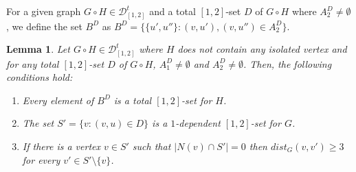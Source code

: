 \documentclass[A4,12pt]{article}
\newtheorem{lemma}[theorem]{Lemma}
\theoremstyle{definition}
\theoremstyle{remark}
\begin{document}
 For a given graph $G \circ H \in \mathcal{D}^t_{[1,2]}$ and a total $[1,2]$-set $D$ of  $G \circ H$ where $A_2^D\neq \emptyset$, we define the set $B^D$ as
 $B^D=\{\{u',u''\}:(v,u'),(v,u'')\in A_2^D\}.$
\begin{lemma}\label{Lex1and2}
Let $G \circ H \in \mathcal{D}^t_{[1,2]}$ where $H$ does not contain any isolated vertex and for any total $[1,2]$-set $D$ of $G\circ H$, $A_1^D\neq \emptyset$ and $A_2^D\neq \emptyset $. Then,  the following conditions  hold:
\begin{enumerate}
  \item [1)]
 Every element of  $B^D$ is a total $[1,2]$-set for $H$.
\item [2)]
The set $S'=\{v: (v,u) \in D\}$ is a $1$-dependent $[1,2]$-set for $G$.
 \item [3)]
 If there is a vertex $v\in S'$ such that $\vert N(v)\cap S'\vert =0$ then $dist_G(v,v')\geq 3$ for every $v' \in S'\setminus \{v\}$.
 \end{enumerate}
 \end{lemma}
\end{document}
